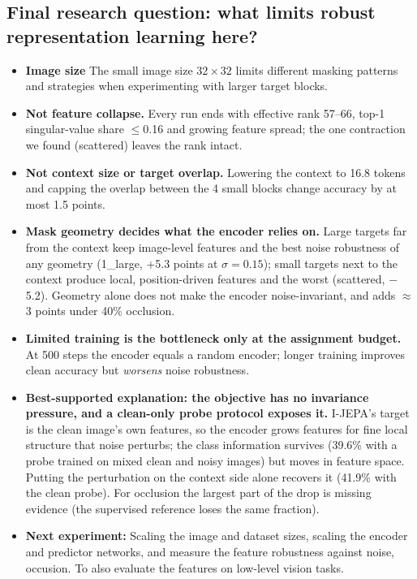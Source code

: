 \subsection*{Final research question: what limits robust representation learning here?}
\begin{itemize}
\item \textbf{Image size} The small image size $32\times32$ limits different masking patterns and strategies when experimenting with larger target blocks.
\item \textbf{Not feature collapse.} Every run ends with effective rank 57--66, top-1 singular-value share $\le$0.16 and growing
feature spread; the one contraction we found (scattered) leaves the rank intact.
\item \textbf{Not context size or target overlap.} Lowering the context to 16.8 tokens and capping the overlap between the
4 small blocks change accuracy by at most 1.5 points.
\item \textbf{Mask geometry decides what the encoder relies on.} Large targets far from the context keep image-level
features and the best noise robustness of any geometry (1\_large, +5.3 points at $\sigma{=}0.15$); small targets next to the
context produce local, position-driven features and the worst (scattered, $-$5.2). Geometry alone does not make the encoder
noise-invariant, and adds $\approx$3 points under 40\% occlusion.
\item \textbf{Limited training is the bottleneck only at the assignment budget.} At 500 steps the encoder equals a random encoder;
longer training improves clean accuracy but \emph{worsens} noise robustness.
\item \textbf{Best-supported explanation: the objective has no invariance pressure, and a clean-only probe protocol exposes it.}
I-JEPA's target is the clean image's own features, so the encoder grows features for fine local structure that noise
perturbs; the class information survives (39.6\% with a probe trained on mixed clean and noisy images) but moves in feature space. Putting the
perturbation on the context side alone recovers it (41.9\% with the clean probe). For occlusion the largest part of the drop
is missing evidence (the supervised reference loses the same fraction).
\item \textbf{Next experiment:} Scaling the image and dataset sizes, scaling the encoder and predictor networks, 
and measure the feature robustness against noise, occusion. To also evaluate the features on low-level vision tasks.
\end{itemize}

